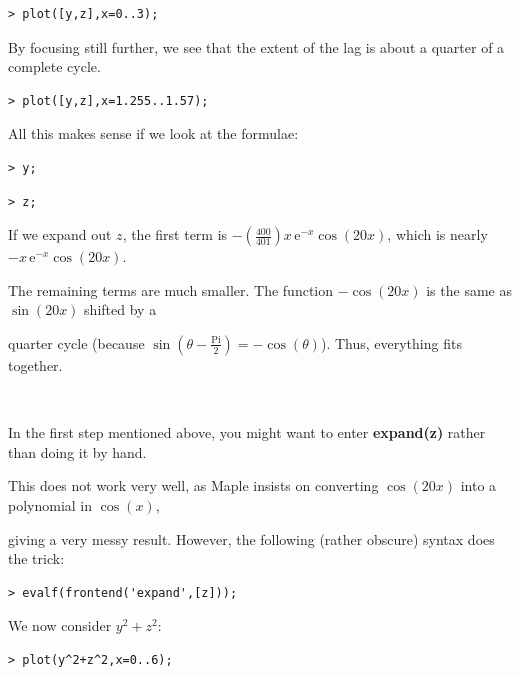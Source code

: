 \documentclass{article}
\begin{document}
\begin{lstlisting}
> plot([y,z],x=0..3);
\end{lstlisting}
\begin{Maple Normal}
By focusing still further, we see that the extent of the lag is about a quarter of a complete cycle.
\end{Maple Normal}
\begin{lstlisting}
> plot([y,z],x=1.255..1.57);
\end{lstlisting}
\begin{Maple Normal}
All this makes sense if we look at the formulae:
\end{Maple Normal}
\begin{lstlisting}
> y;
\end{lstlisting}
\begin{lstlisting}
> z;
\end{lstlisting}
\begin{Maple Normal}
If we expand out 
$z$, the first term is 
$-(\frac{400}{401}) x \,{\mathrm e}^{-x} \cos (20 x)$, which is nearly 
$-x \,{\mathrm e}^{-x} \cos (20 x)$.  \

The remaining terms are much smaller.  The function 
$-\cos (20 x)$ is the same as 
$\sin (20 x)$ shifted by a \

quarter cycle (because 
$\sin (\theta -\frac{\mathrm{Pi}}{2})=-\cos (\theta)$).  Thus, everything fits together.\

\


\end{Maple Normal}
\begin{Maple Normal}
In the first step mentioned above, you might want to enter \textcolor[RGB]{255,0,0}{\textbf{expand(z)}} rather than doing it by hand.\

This does not work very well, as Maple insists on converting 
$\cos (20 x)$ into a polynomial in 
$\cos (x)$,\

giving a very messy result.  However, the following (rather obscure) syntax does the trick:
\end{Maple Normal}
\begin{lstlisting}
> evalf(frontend('expand',[z]));
\end{lstlisting}
\begin{Maple Normal}

\end{Maple Normal}
\begin{Maple Normal}
We now consider 
$y^{2}+z^{2}$:
\end{Maple Normal}
\begin{lstlisting}
> plot(y^2+z^2,x=0..6);
\end{lstlisting}
\end{document}
